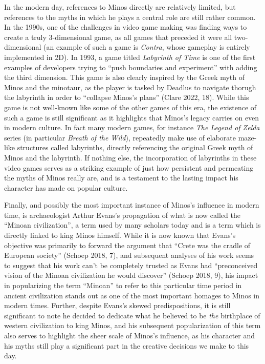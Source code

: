 \documentclass[12pt]{article}
\begin{document}
	In the modern day, references to Minos directly are relatively limited, but references to the myths in which 
	he plays a central role are still rather common. In the 1990s, one of the challenges in video game making was 
	finding ways to create a truly 3-dimensional game, as all games that preceded it were all two-dimensional (an 
	example of such a game is \textit{Contra}, whose gameplay is entirely implemented in 2D). In 1993, a game 
	titled \textit{Labyrinth of Time} is one of the first examples of developers trying to 
	``push boundaries and experiment'' with adding the third dimension. This game is also clearly inspired 
	by the Greek myth of Minos and the minotaur, as the player is tasked by Deadlus to navigate thorugh the 
	labyrinth in order to ``collapse Minos's plans'' (Clare 2022, 18). While this game is not well-known like 
	some of the other games of this era, the existence of such a game is still significant as it highlights that 
	Minos's legacy carries on even in modern culture. In fact many modern games, for instance \textit{The Legend 
	of Zelda} series (in particular \textit{Breath of the Wild}), 
	repeatedly make use of elaborate maze-like structures called labyrinths, directly 
	referencing the original Greek myth of Minos and the labyrinth. If nothing else, the incorporation of 
	labyrinths in these video games serves as a striking example of just how persistent and permeating the myths of 
	Minos really are, and is a testament to the lasting impact his character has made on popular culture.  

	Finally, and possibly the most important instance of Minos's influence in modern time, is archaeologist 
	Arthur Evans's 
	propagation of what is now called the ``Minoan civilization'', a term used by many scholars today and is 
	a term which is directly linked to king Minos himself. While it is now known that 
	Evans's objective was primarily to forward the argument that ``Crete was the cradle 
	of European society'' (Schoep 2018, 7), and subsequent analyses of his work seems to suggest that his work 
	can't be completely trusted as 
	Evans had ``preconceived vision of the Minoan civilization he would discover'' (Schoep 2018, 9), his impact 
	in popularizing the term ``Minoan'' to refer to this particular time period in ancient civilization stands out as 
	one of the most important homages to Minos in modern times. Further, despite Evans's skewed predispositions, 
	it is still significant to note he decided to dedicate what he believed to be 
	\textit{the} birthplace of western civilization to king Minos, and his subsequent popularization of this term 
	also serves to highlight the sheer scale of Minos's influence, as his character and his myths still play a 
	significant part in the creative decisions we make to this day. 
\end{document}
